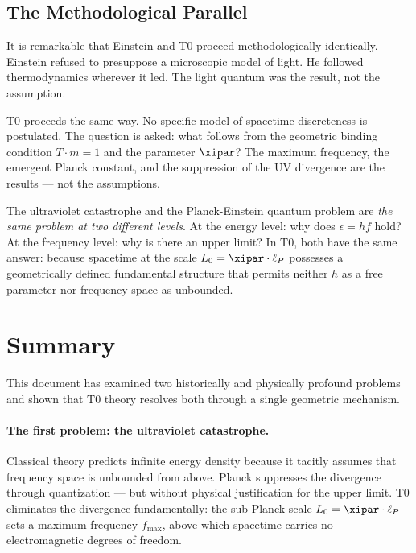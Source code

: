 \subsection{The Methodological Parallel}

It is remarkable that Einstein and T0 proceed methodologically identically. Einstein 
refused to presuppose a microscopic model of light. He followed thermodynamics 
wherever it led. The light quantum was the result, not the assumption.

T0 proceeds the same way. No specific model of spacetime discreteness is postulated. 
The question is asked: what follows from the geometric binding condition $T \cdot m = 1$ 
and the parameter $\xipar$? The maximum frequency, the emergent Planck constant, 
and the suppression of the UV divergence are the results — not the assumptions.

\begin{revolutionary}
    The ultraviolet catastrophe and the Planck-Einstein quantum problem are 
    \emph{the same problem at two different levels}. At the energy level: why does 
    $\epsilon = hf$ hold? At the frequency level: why is there an upper limit? In T0, 
    both have the same answer: because spacetime at the scale $L_0 = \xipar \cdot \ell_P$ 
    possesses a geometrically defined fundamental structure that permits neither $h$ 
    as a free parameter nor frequency space as unbounded.
\end{revolutionary}

\clearpage

\section{Summary}
\label{sec:summary}

This document has examined two historically and physically profound problems and 
shown that T0 theory resolves both through a single geometric mechanism.

\paragraph{The first problem: the ultraviolet catastrophe.}
Classical theory predicts infinite energy density because it tacitly assumes that 
frequency space is unbounded from above. Planck suppresses the divergence through 
quantization — but without physical justification for the upper limit. T0 eliminates 
the divergence fundamentally: the sub-Planck scale $L_0 = \xipar \cdot \ell_P$ 
sets a maximum frequency $f_{\max}$, above which spacetime carries no electromagnetic 
degrees of freedom.

